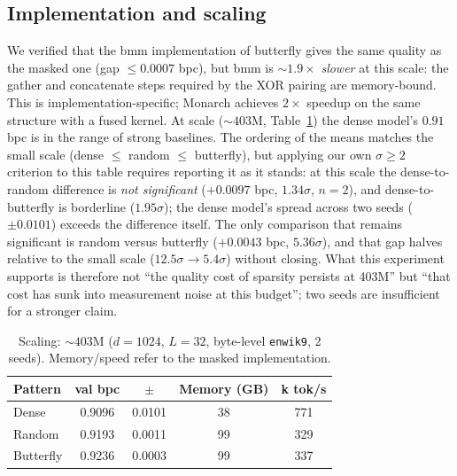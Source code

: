 \documentclass[10pt,journal]{IEEEtran}
\begin{document}
\subsection{Implementation and scaling}
We verified that the bmm implementation of butterfly gives the same quality as the masked one
(gap $\le 0.0007$ bpc), but bmm is $\sim\!1.9\times$ \emph{slower} at this scale: the gather and
concatenate steps required by the XOR pairing are memory-bound. This is implementation-specific;
Monarch \cite{dao2022} achieves $2\times$ speedup on the same structure with a fused kernel. At
scale ($\sim\!403$M, Table~\ref{tab:scale}) the dense model's $0.91$ bpc is in the range of strong
baselines. The ordering of the means matches the small scale (dense $\le$ random $\le$
butterfly), but applying our own $\sigma\!\ge\!2$ criterion to this table requires reporting it
as it stands: at this scale the dense-to-random difference is \emph{not significant}
($+0.0097$ bpc, $1.34\sigma$, $n{=}2$), and dense-to-butterfly is borderline ($1.95\sigma$); the
dense model's spread across two seeds ($\pm0.0101$) exceeds the difference itself. The only
comparison that remains significant is random versus butterfly ($+0.0043$ bpc, $5.36\sigma$),
and that gap halves relative to the small scale ($12.5\sigma \to 5.4\sigma$) without closing.
What this experiment supports is therefore not ``the quality cost of sparsity persists at
403M'' but ``that cost has sunk into measurement noise at this budget''; two seeds are
insufficient for a stronger claim.

\begin{table}[!t]
\centering
\footnotesize
\caption{Scaling: $\sim\!403$M ($d{=}1024$, $L{=}32$, byte-level \texttt{enwik9}, 2 seeds).
Memory/speed refer to the masked implementation.}
\label{tab:scale}
\begin{tabular}{@{}lcccc@{}}
\toprule
Pattern & val bpc & $\pm$ & Memory (GB) & k tok/s \\
\midrule
Dense     & 0.9096 & 0.0101 & 38 & 771 \\
Random    & 0.9193 & 0.0011 & 99 & 329 \\
Butterfly & 0.9236 & 0.0003 & 99 & 337 \\
\bottomrule
\end{tabular}
\end{table}

\end{document}
